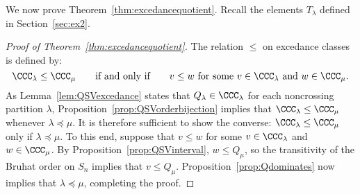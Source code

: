 \documentclass[12pt]{amsart}
\theoremstyle{definition}
\theoremstyle{remark}
\numberwithin{equation}{section}
\begin{document}
We now prove Theorem~\ref{thm:excedancequotient}.  Recall the elements $T_{\lambda}$ defined in Section~\ref{sec:ex2}.

\begin{proof}[Proof of Theorem~\ref{thm:excedancequotient}]
The relation $\le$ on excedance classes is defined by:
\[
\CCC_{\lambda} \le \CCC_{\mu}
\qquad\text{if and only if}\qquad
\text{$v \le w$ for some $v \in \CCC_{\lambda}$ and $w \in \CCC_{\mu}$}.
\]
As Lemma~\ref{lem:QSVexcedance} states that $Q_{\lambda} \in \CCC_{\lambda}$ for each noncrossing partition $\lambda$, Proposition~\ref{prop:QSVorderbijection} implies that $\CCC_{\lambda} \le \CCC_{\mu}$ whenever $\lambda \preceq \mu$.  It is therefore sufficient to show the converse: $\CCC_{\lambda} \le \CCC_{\mu}$ only if $\lambda \preceq \mu$.  To this end, suppose that $v \le w$ for some $v \in \CCC_{\lambda}$ and $w \in \CCC_{\mu}$.  By Proposition~\ref{prop:QSVinterval}, $w \le Q_{\mu}$, so the transitivity of the Bruhat order on $S_{n}$ implies that $v \le Q_{\mu}$.   Proposition~\ref{prop:Qdominates} now implies that $\lambda \preceq \mu$, completing the proof.
\end{proof}
\end{document}
